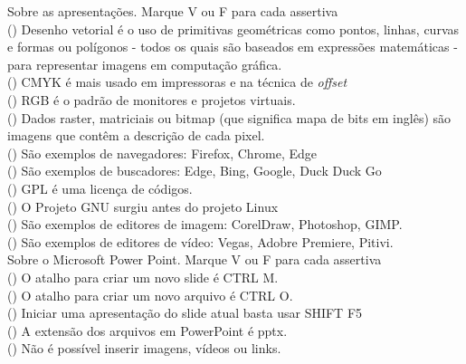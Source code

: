 \documentclass[12pt]{exam}
\begin{document}
\begin{questions}
\question Sobre as apresentações. Marque V ou F para cada assertiva\\
(\hspace{6px}) Desenho vetorial é o uso de primitivas geométricas como pontos, linhas, curvas e formas ou polígonos - todos os quais são baseados em expressões matemáticas - para representar imagens em computação gráfica. \\
(\hspace{6px}) CMYK é mais usado em impressoras e na técnica de \textit{offset} \\
(\hspace{6px}) RGB é o padrão de monitores e projetos virtuais. \\
(\hspace{6px}) Dados raster, matriciais ou bitmap (que significa mapa de bits em inglês) são imagens que contêm a descrição de cada pixel.\\
(\hspace{6px}) São exemplos de navegadores: Firefox, Chrome, Edge\\
(\hspace{6px}) São exemplos de buscadores: Edge, Bing, Google, Duck Duck Go\\
(\hspace{6px}) GPL é uma licença de códigos. \\
(\hspace{6px}) O Projeto GNU surgiu antes do projeto Linux\\
(\hspace{6px}) São exemplos de editores de imagem: CorelDraw, Photoshop, GIMP.\\
(\hspace{6px}) São exemplos de editores de vídeo: Vegas, Adobre Premiere, Pitivi.\\

\question Sobre o Microsoft Power Point. Marque V ou F para cada assertiva\\
(\hspace{6px}) O atalho para criar um novo slide é CTRL M. \\
(\hspace{6px}) O atalho para criar um novo arquivo é CTRL O. \\
(\hspace{6px}) Iniciar uma apresentação do slide atual basta usar SHIFT F5\\
(\hspace{6px}) A extensão dos arquivos em PowerPoint é pptx. \\
(\hspace{6px}) Não é possível inserir imagens, vídeos ou links.\\



\end{questions}
\end{document}
